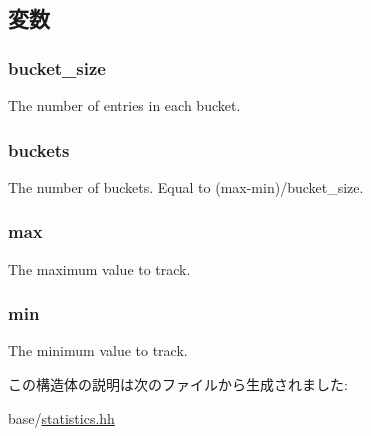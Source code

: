 \subsection{変数}
\hypertarget{structStats_1_1DistStor_1_1Params_acf3483d9fb89e37ad01724a4428b3dd2}{
\subsubsection[{bucket\_\-size}]{ {\bf bucket\_\-size}}}
\label{structStats_1_1DistStor_1_1Params_acf3483d9fb89e37ad01724a4428b3dd2}
The number of entries in each bucket. \hypertarget{structStats_1_1DistStor_1_1Params_a94003530caa509b59d5355518e0ac58b}{
\subsubsection[{buckets}]{ {\bf buckets}}}
\label{structStats_1_1DistStor_1_1Params_a94003530caa509b59d5355518e0ac58b}
The number of buckets. Equal to (max-\/min)/bucket\_\-size. \hypertarget{structStats_1_1DistStor_1_1Params_af81be55c0ee79705d7fee6179089b184}{
\subsubsection[{max}]{ {\bf max}}}
\label{structStats_1_1DistStor_1_1Params_af81be55c0ee79705d7fee6179089b184}
The maximum value to track. \hypertarget{structStats_1_1DistStor_1_1Params_a6205e1c26a829364bc95a93283f20e22}{
\subsubsection[{min}]{ {\bf min}}}
\label{structStats_1_1DistStor_1_1Params_a6205e1c26a829364bc95a93283f20e22}
The minimum value to track. 

この構造体の説明は次のファイルから生成されました:\begin{DoxyCompactItemize}
\item 
base/\hyperlink{statistics_8hh}{statistics.hh}\end{DoxyCompactItemize}
